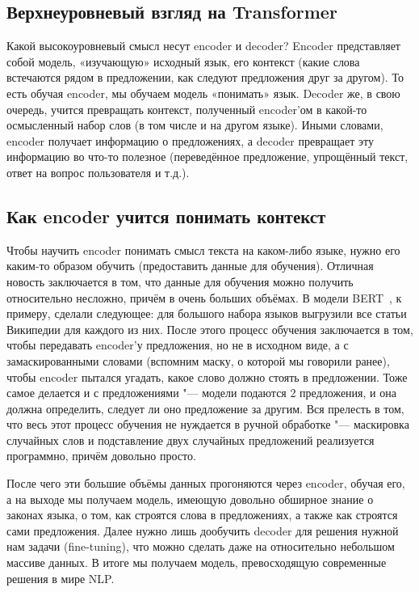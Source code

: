 \subsection{Верхнеуровневый взгляд на Transformer}


Какой высокоуровневый смысл несут encoder и decoder? Encoder представляет собой модель, «изучающую» исходный язык, его контекст (какие слова встечаются рядом в предложении, как следуют предложения друг за другом). То есть обучая encoder, мы обучаем модель «понимать» язык. Decoder же, в свою очередь, учится превращать контекст, полученный encoder'ом в какой-то осмысленный набор слов (в том числе и на другом языке). Иными словами, encoder получает информацию о предложениях, а decoder превращает эту информацию во что-то полезное (переведённое предложение, упрощённый текст, ответ на вопрос пользователя и т.д.).


\subsection{Как encoder учится понимать контекст}


Чтобы научить encoder понимать смысл текста на каком-либо языке, нужно его каким-то образом обучить (предоставить данные для обучения).
Отличная новость заключается в том, что данные для обучения можно получить относительно несложно, причём в очень больших объёмах.
В модели BERT~\cite{BERTmodel}, к примеру, сделали следующее: для большого набора языков выгрузили все статьи Википедии для каждого из них.
После этого процесс обучения заключается в том, чтобы передавать encoder'у предложения, но не в исходном виде, а с замаскированными словами (вспомним маску, о которой мы говорили ранее), чтобы encoder пытался угадать, какое слово должно стоять в предложении.
Тоже самое делается и с предложениями "--- модели подаются 2 предложения, и она должна определить, следует ли оно предложение за другим.
Вся прелесть в том, что весь этот процесс обучения не нуждается в ручной обработке "--- маскировка случайных слов и подставление двух случайных предложений реализуется программно, причём довольно просто.

После чего эти большие объёмы данных прогоняются через encoder, обучая его, а на выходе мы получаем модель, имеющую довольно обширное знание о законах языка, о том, как строятся слова в предложениях, а также как строятся сами предложения. Далее нужно лишь дообучить decoder для решения нужной нам задачи (fine-tuning), что можно сделать даже на относительно небольшом массиве данных. В итоге мы получаем модель, превосходящую современные решения в мире NLP.
